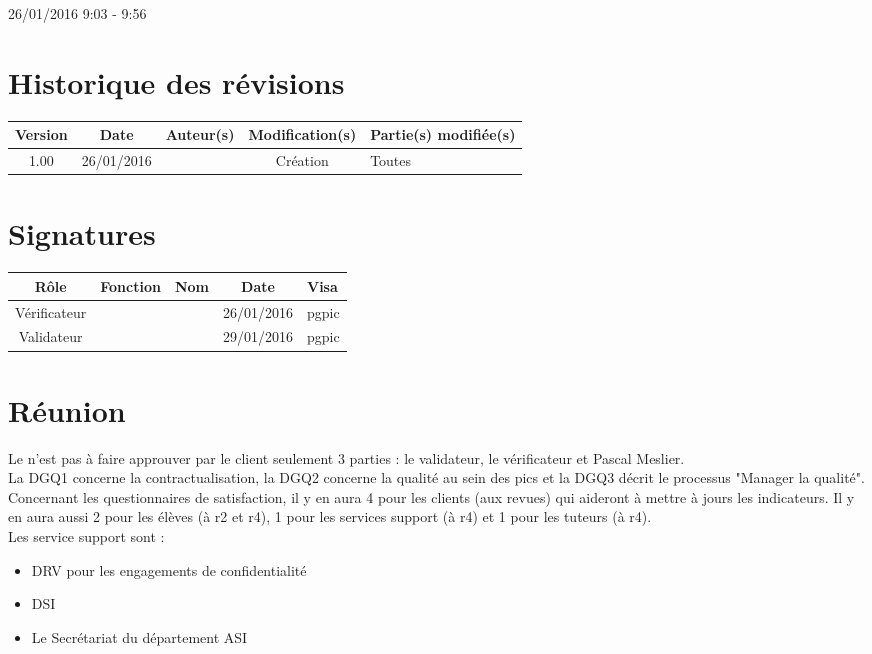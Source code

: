 \documentclass [a4paper] {article}
\begin{document}
\rhead{}

26/01/2016
\hfill   
\hfill 	9:03 - 9:56 				%



\section*{Historique des révisions}
\begin{center}
			\begin{tabular}{| c | c | c | c | p{4cm} |}
				\hline
				\rowcolor{Gray}
				Version & Date & Auteur(s) & Modification(s) & Partie(s) modifiée(s)		 \\
				\hline
				1.00 & 26/01/2016 & \Pierre & Création & Toutes \\
		\hline		
			\end{tabular}
		\end{center}

\section*{Signatures}

		\begin{center}
			\begin{tabular}{| c | c | c | c | p{4cm} |}
				\hline
				\rowcolor{Gray}
				Rôle & Fonction & Nom & Date & Visa		 \\
				\hline
				Vérificateur & \RQA & \Kafui & 26/01/2016 & pgpic \\[30pt]
				\hline
				Validateur & \CP & \Sergi & 29/01/2016 & pgpic \\[30pt]	
				\hline
			\end{tabular}
		\end{center}


\section{Réunion}
Le \PQ{} n'est pas à faire approuver par le client seulement 3 parties : le validateur, le vérificateur et Pascal Meslier.
\\
La DGQ1 concerne la contractualisation, la DGQ2 concerne la qualité au sein des pics et la DGQ3 décrit le processus "Manager la qualité".
\\
Concernant les questionnaires de satisfaction, il y en aura 4 pour les clients (aux revues) qui aideront à mettre à jours les indicateurs. Il y en aura aussi 2 pour les élèves (à r2 et r4), 1 pour les services support (à r4) et 1 pour les tuteurs (à r4).
\\
Les service support sont : 
\begin{itemize}
\item DRV pour les engagements de confidentialité
\item DSI
\item Le Secrétariat du département ASI
\end{itemize}
\end{document}
